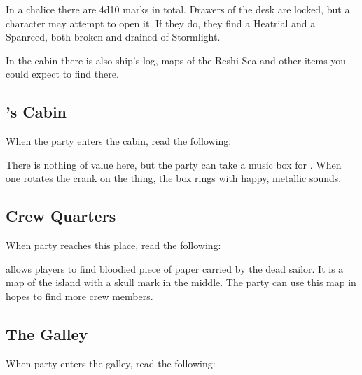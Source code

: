 In a chalice there are 4d10 marks in total. Drawers of the desk are locked, but a character may attempt  to open it. If they do, they find a Heatrial and a Spanreed, both broken and drained of Stormlight. 

In the cabin there is also ship's log, maps of the Reshi Sea and other items you could expect to find there.


\subsection{\npcSickGirl{}'s Cabin}

When the party enters the cabin, read the following:


There is nothing of value here, but the party can take a music box for \npcSickGirl{}. When one rotates the crank on the thing, the box rings with happy, metallic sounds.

\subsection{Crew Quarters}
\label{sec:crewQuarters}

When party reaches this place, read the following:


 allows players to find bloodied piece of paper carried by the dead sailor. It is a map of the island with a skull mark in the middle. The party can use this map in hopes to find more crew members.

\subsection{The Galley}

When party enters the galley, read the following:

